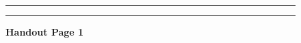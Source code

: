 \documentclass[]{article}
\begin{document}
\begin{figure}[!ht]
    \hrule
    \caption{ \textbf{Handout Page 1} }
    \begin{center}
    \end{center}
    \label{fig:handout-1}
    \hrule
\end{figure}

\newpage
\end{document}
